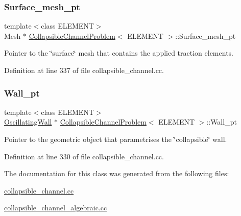 \subsubsection{\texorpdfstring{Surface\+\_\+mesh\+\_\+pt}{Surface\_mesh\_pt}}
{\footnotesize\ttfamily template$<$class E\+L\+E\+M\+E\+NT$>$ \\
Mesh $\ast$ \hyperlink{classCollapsibleChannelProblem}{Collapsible\+Channel\+Problem}$<$ E\+L\+E\+M\+E\+NT $>$\+::Surface\+\_\+mesh\+\_\+pt\hspace{0.3cm}{\ttfamily [private]}}



Pointer to the \char`\"{}surface\char`\"{} mesh that contains the applied traction elements. 



Definition at line 337 of file collapsible\+\_\+channel.\+cc.

\mbox{\label{classCollapsibleChannelProblem_a54065436b8f884469ed80eae6fe67a5c}} 
\subsubsection{\texorpdfstring{Wall\+\_\+pt}{Wall\_pt}}
{\footnotesize\ttfamily template$<$class E\+L\+E\+M\+E\+NT$>$ \\
\hyperlink{classOscillatingWall}{Oscillating\+Wall} $\ast$ \hyperlink{classCollapsibleChannelProblem}{Collapsible\+Channel\+Problem}$<$ E\+L\+E\+M\+E\+NT $>$\+::Wall\+\_\+pt\hspace{0.3cm}{\ttfamily [private]}}



Pointer to the geometric object that parametrises the \char`\"{}collapsible\char`\"{} wall. 



Definition at line 330 of file collapsible\+\_\+channel.\+cc.



The documentation for this class was generated from the following files\+:\begin{DoxyCompactItemize}
\item 
\hyperlink{collapsible__channel_8cc}{collapsible\+\_\+channel.\+cc}\item 
\hyperlink{collapsible__channel__algebraic_8cc}{collapsible\+\_\+channel\+\_\+algebraic.\+cc}\end{DoxyCompactItemize}
